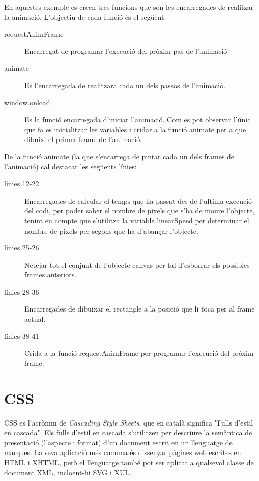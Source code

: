En aquestes exemple es creen tres funcions que són les encarregades de realitzar la animació. L'objectiu de cada funció és el següent:

\begin{description}
    \item[requestAnimFrame]{ Encarregat de programar l'execució del pròxim pas de l'animació}
    \item[animate]{ Es l'encarregada de realitzara cada un dels passos de l'animació.}
    \item[window.onload] { Es la funció encarregada d'iniciar l'animació. Com es pot observar l'únic que fa es inicialitzar les variables i cridar a la funció animate per a que dibuixi el primer frame de l'animació.}
\end{description}

De la funció animate (la que s'encarrega de pintar cada un dels frames de l'animació) cal destacar les següents línies:

\begin{description}
    \item[línies 12-22] {Encarregades de calcular el temps que ha passat des de l'ultima execució del codi, per poder saber el nombre de pixels que s'ha de moure l'objecte, tenint en compte que s'utilitza la variable linearSpeed per determinar el nombre de pixels per segons que ha d'abançar l'objecte.}
    \item[línies 25-26] {Netejar tot el conjunt de l'objecte canvas per tal d'esborrar els possibles frames anteriors.}
    \item[línies 28-36] {Encarregades de dibuixar el rectangle a la posició que li toca per al frame actual.}
    \item[línies 38-41] {Crida a la funció requestAnimFrame per programar l'execució del pròxim frame.}
\end{description} 


\section{CSS}

CSS es l'acrònim de \emph{Cascading Style Sheets}, que en català significa "Fulls d'estil en cascada". Els fulls d'estil en cascada s'utilitzen per descriure la semàntica de presentació (l'aspecte i format) d'un document escrit en un llenguatge de marques. La seva aplicació més comuna és dissenyar pàgines web escrites en HTML i XHTML, però el llenguatge també pot ser aplicat a qualsevol classe de document XML, incloent-hi SVG i XUL.

